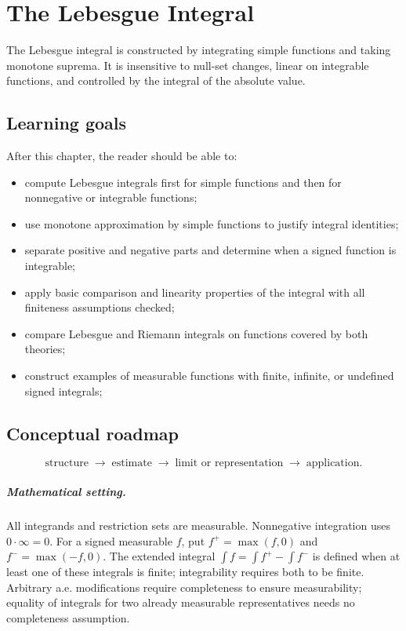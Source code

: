 \chapter{The Lebesgue Integral}
\label{ch:iii03}

The Lebesgue integral is constructed by integrating simple functions and taking monotone suprema. It is insensitive to null-set changes, linear on integrable functions, and controlled by the integral of the absolute value.

\section*{Learning goals}
After this chapter, the reader should be able to:
\begin{itemize}
\item compute Lebesgue integrals first for simple functions and then for nonnegative or integrable functions;
\item use monotone approximation by simple functions to justify integral identities;
\item separate positive and negative parts and determine when a signed function is integrable;
\item apply basic comparison and linearity properties of the integral with all finiteness assumptions checked;
\item compare Lebesgue and Riemann integrals on functions covered by both theories;
\item construct examples of measurable functions with finite, infinite, or undefined signed integrals;
\end{itemize}
\section*{Conceptual roadmap}
\[
\boxed{\text{structure}\;\longrightarrow\;\text{estimate}\;\longrightarrow\;\text{limit or representation}\;\longrightarrow\;\text{application}.}
\]

\paragraph{Mathematical setting.}
All integrands and restriction sets are measurable. Nonnegative integration uses $0\cdot\infty=0$. For a signed measurable $f$, put $f^+=\max(f,0)$ and $f^-=\max(-f,0)$. The extended integral $\int f=\int f^+-\int f^-$ is defined when at least one of these integrals is finite; integrability requires both to be finite. Arbitrary a.e. modifications require completeness to ensure measurability; equality of integrals for two already measurable representatives needs no completeness assumption.

